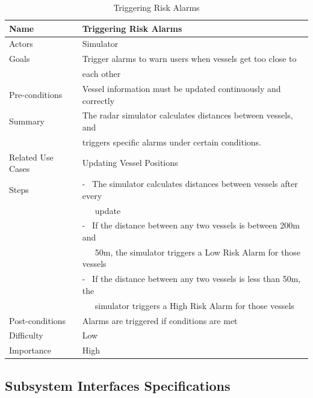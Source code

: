 \documentclass[12pt]{article}
\begin{document}
\begin{table}[ht]
\centering
   \begin{tabular}{|l|l|}
        \hline
        {\large Name} & {\large Triggering Risk Alarms} \\
        \hline\hline
        Actors & Simulator\\
        \hline
        Goals & Trigger alarms to warn users when vessels get too close to\\
         & each other\\
        \hline
        Pre-conditions & Vessel information must be updated continuously and correctly\\
        \hline
        Summary & The radar simulator calculates distances between vessels, and\\
         & triggers specific alarms under certain conditions.\\
        \hline
        Related Use Cases & Updating Vessel Positions\\
        \hline
        Steps & - \ The simulator calculates distances between vessels after every\\
         & \ \ \ update\\
         & - \ If the distance between any two vessels is between 200m and\\
         & \ \ \  50m, the simulator triggers a Low Risk Alarm for those vessels\\
          & - \ If the distance between any two vessels is less than 50m, the\\
         & \ \ \ simulator triggers a High Risk Alarm for those vessels\\
        \hline
        Post-conditions & Alarms are triggered if conditions are met\\
        \hline
        Difficulty & Low\\
        \hline
        Importance & High\\
        \hline
    \end{tabular}
\caption{Triggering Risk Alarms}
\end{table}
\clearpage




\subsection{Subsystem Interfaces Specifications}
\end{document}
